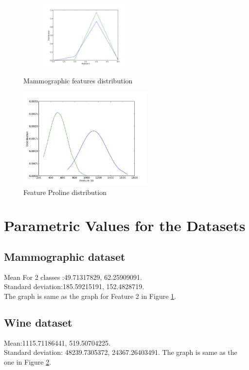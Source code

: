 \documentclass[11pt, pdftex]{article}
\begin{document}
\begin{figure}
\begin{subfigure}
\end{subfigure}
\begin{subfigure}
  \centering
  \includegraphics[width=0.5\textwidth]{pics/mam5.png}
\end{subfigure}
\caption{Mammographic features distribution}
\label{fig:mam}
\end{figure}

\begin{figure}
    \centering
    \includegraphics[width=0.6\textwidth]{pics/wine14.png} 
    \caption{Feature Proline distribution}
    \label{fig:wine}
\end{figure}
\section{Parametric Values for the Datasets}
\subsection{Mammographic dataset}
Mean For 2 classes :49.71317829, 62.25909091. \\
Standard deviation:185.59215191, 152.4828719. \\
The graph is same as the graph for Feature 2 in Figure \ref{fig:mam}.
\subsection{Wine dataset}
Mean:1115.71186441, 519.50704225. \\
Standard deviation: 48239.7305372, 24367.26403491.
The graph is same as the one in Figure \ref{fig:wine}.
\end{document}

